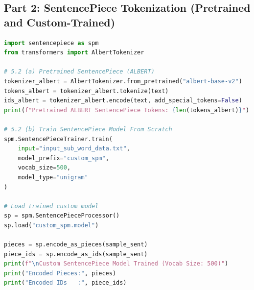 \subsection{Part 2: SentencePiece Tokenization (Pretrained and Custom-Trained)}
\begin{lstlisting}[language=Python, caption={Experiment 5.2: SentencePiece Implementation}]
import sentencepiece as spm
from transformers import AlbertTokenizer

# 5.2 (a) Pretrained SentencePiece (ALBERT)
tokenizer_albert = AlbertTokenizer.from_pretrained("albert-base-v2")
tokens_albert = tokenizer_albert.tokenize(text)
ids_albert = tokenizer_albert.encode(text, add_special_tokens=False)
print(f"Pretrained ALBERT SentencePiece Tokens: {len(tokens_albert)}")

# 5.2 (b) Train SentencePiece Model From Scratch
spm.SentencePieceTrainer.train(
    input="input_sub_word_data.txt",
    model_prefix="custom_spm",
    vocab_size=500,
    model_type="unigram"
)

# Load trained custom model
sp = spm.SentencePieceProcessor()
sp.load("custom_spm.model")

pieces = sp.encode_as_pieces(sample_sent)
piece_ids = sp.encode_as_ids(sample_sent)
print(f"\nCustom SentencePiece Model Trained (Vocab Size: 500)")
print("Encoded Pieces:", pieces)
print("Encoded IDs   :", piece_ids)
\end{lstlisting}

